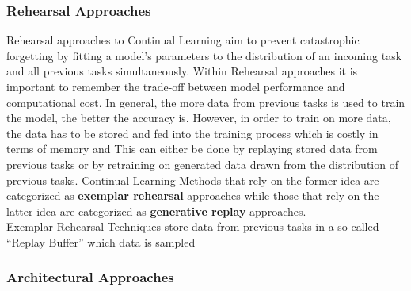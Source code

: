 \subsubsection{Rehearsal Approaches}
\label{sec:RehearsalApproaches}
Rehearsal approaches to Continual Learning aim to prevent catastrophic forgetting by fitting a model's parameters to the distribution
of an incoming task and all previous tasks simultaneously. Within Rehearsal approaches it is important to remember the trade-off between
model performance and computational cost. In general, the more data from previous tasks is used to train the model, the better the accuracy is. 
However, in order to train on more data, the data has to be stored and fed into the training process which is costly in terms of memory and This can either be done by replaying stored data from previous tasks or by
retraining on generated data drawn from the distribution of previous tasks. Continual Learning Methods that rely on the former idea are
categorized as \textbf{exemplar rehearsal} approaches while those that rely on the latter idea are categorized as \textbf{generative replay}
approaches. \\
Exemplar Rehearsal Techniques store data from previous tasks in a so-called \enquote{Replay Buffer} which data is sampled



\subsubsection{Architectural Approaches}
\label{sec:ArchitecturalApproaches}


